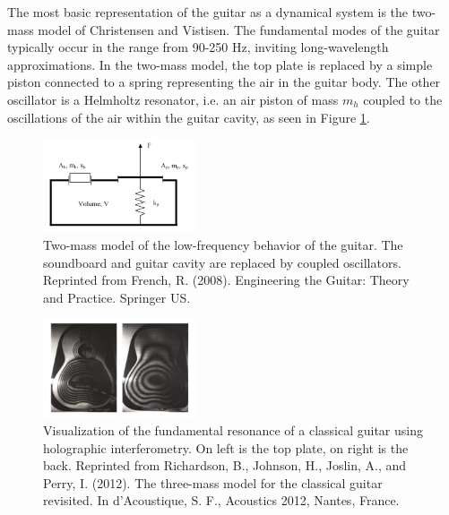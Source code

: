 \documentclass[
reprint,amsmath,amssymb,showpacs,citeautoscript,prb,twocolumn,notitlepage,floatfix
]{revtex4-1}
\begin{document}
The most basic representation of the guitar as a dynamical system is the two-mass model of Christensen and Vistisen.\cite{christensen1980:doi:10.1121/1.384814} The fundamental modes of the guitar typically occur in the range from 90-250 Hz, inviting long-wavelength approximations. In the two-mass model, the top plate is replaced by a simple piston connected to a spring representing the air in the guitar body. The other oscillator is a Helmholtz resonator, i.e. an air piston of mass $m_h$ coupled to the oscillations of the air within the guitar cavity, as seen in Figure \ref{fig:two-mass-model}.
\begin{figure}[ht]
    \begin{center}
        \includegraphics[width=0.4\textwidth]{images/french2008-two-mass-model.png}
        \caption{Two-mass model of the low-frequency behavior of the guitar. The soundboard and guitar cavity are replaced by coupled oscillators.  Reprinted from  French, R. (2008). Engineering the Guitar: Theory and Practice. Springer US.}
        \label{fig:two-mass-model}
    \end{center}
\end{figure}
\begin{figure}[ht]
    \begin{center}
        \includegraphics[width=0.4\textwidth]{images/richardson2012-fundamental-modes-holography.jpg}
        \caption{Visualization of the fundamental resonance of a classical guitar using holographic interferometry. On left is the top plate, on right is the back. Reprinted from Richardson, B., Johnson, H., Joslin, A., and Perry, I. (2012). The three-mass model for the classical guitar revisited. In d’Acoustique, S. F., Acoustics 2012, Nantes, France.}
        \label{fig:holography-fundamental-mode}
    \end{center}
\end{figure}
\end{document}
